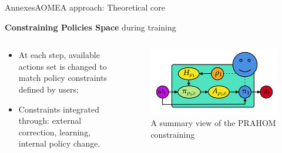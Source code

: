 \begin{frame}{Annexes}{AOMEA approach: Theoretical core}

    \textbf{Constraining Policies Space} during training

    \begin{columns}

        \begin{column}{0.3\textwidth}

            \begin{itemize}
                \item At each step, available actions set is changed to match policy constraints defined by users;
                \item Constraints integrated through: external correction, learning, internal policy change.
            \end{itemize}

        \end{column}

        \begin{column}{0.8\textwidth}
            \begin{figure}
                \centering
                \includegraphics[width=0.7\linewidth]{figures/prahom_training_constrain.png}
                \caption*{A summary view of the PRAHOM constraining}
                \label{fig:prahom_process}
            \end{figure}
        \end{column}

    \end{columns}

\end{frame}


